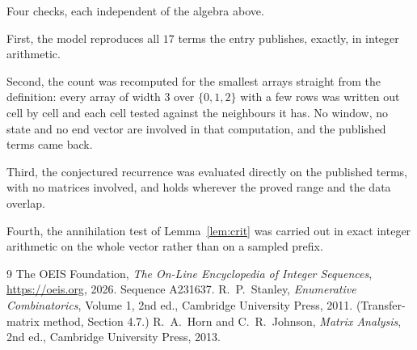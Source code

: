 \documentclass[11pt,a4paper]{article}
\theoremstyle{plain}
\theoremstyle{definition}
\begin{document}
Four checks, each independent of the algebra above.

First, the model reproduces all $17$ terms the entry publishes, exactly, in integer
arithmetic.

Second, the count was recomputed for the smallest arrays straight from the definition: every
array of width $3$ over $\{0,1,2\}$ with a few rows was written out cell by cell and each cell
tested against the neighbours it has. No window, no state and no end vector are involved in that
computation, and the published terms came back.

Third, the conjectured recurrence was evaluated directly on the published terms, with no
matrices involved, and holds wherever the proved range and the data overlap.

Fourth, the annihilation test of Lemma~\ref{lem:crit} was carried out in exact integer
arithmetic on the whole vector rather than on a sampled prefix.

\begin{thebibliography}{9}
 The OEIS Foundation, \emph{The On-Line Encyclopedia of Integer
Sequences}, \url{https://oeis.org}, 2026. Sequence A231637.
 R.~P.~Stanley, \emph{Enumerative Combinatorics}, Volume 1, 2nd ed.,
Cambridge University Press, 2011. (Transfer-matrix method, Section 4.7.)
 R.~A.~Horn and C.~R.~Johnson, \emph{Matrix Analysis}, 2nd ed., Cambridge
University Press, 2013.
\end{thebibliography}
\end{document}
